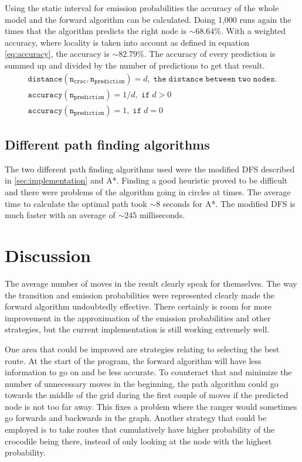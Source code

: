 \documentclass[12pt, a4paper]{article}
\begin{document}
Using the static interval for emission probabilities the accuracy of the whole model and the forward algorithm can be calculated. Doing 1,000 runs again the times that the algorithm predicts the right node is $\sim68.64\%$. With a weighted accuracy, where locality is taken into account as defined in equation \ref{eq:accuracy}, the accuracy is $\sim82.79\%$. The accuracy of every prediction is summed up and divided by the number of predictions to get that result.
\begin{equation}\label{eq:accuracy}
\begin{split}
\mathtt{distance(n_{croc}, n_{prediction})}=d, \; \mathtt{the \; distance \; between \; two \; nodes.}
\\
\mathtt{accuracy(n_{prediction})} = 1 / d, \; \mathtt{if} \; d > 0 \hspace{151pt}
\\
\mathtt{accuracy(n_{prediction})} = 1, \; \mathtt{if} \; d = 0 \hspace{163pt}
\end{split}
\end{equation}

\subsection{Different path finding algorithms}

The two different path finding algorithms used were the modified DFS described in \ref{sec:implementation} and A*. Finding a good heuristic proved to be difficult and there were problems of the algorithm going in circles at times. The average time to calculate the optimal path took $\sim8$ seconds for A*. The modified DFS is much faster with an average of $\sim245$ milliseconds.


\section{Discussion}

The average number of moves in the result clearly speak for themselves. The way the transition and emission probabilities were represented clearly made the forward algorithm undoubtedly effective. There certainly is room for more improvement in the approximation of the emission probabilities and other strategies, but the current implementation is still working extremely well.

One area that could be improved are strategies relating to selecting the best route. At the start of the program, the forward algorithm will have less information to go on and be less accurate. To counteract that and minimize the number of unnecessary moves in the beginning, the path algorithm could go towards the middle of the grid during the first couple of moves if the predicted node is not too far away. This fixes a problem where the ranger would sometimes go forwards and backwards in the graph. Another strategy that could be employed is to take routes that cumulatively have higher probability of the crocodile being there, instead of only looking at the node with the highest probability.
\end{document}
